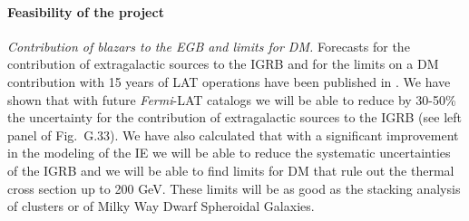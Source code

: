 \documentclass[12 pt]{article}
\begin{document}



\vspace{-0.5cm}
\paragraph{Feasibility of the project}
{\it Contribution of blazars to the EGB and limits for DM.}
Forecasts for the contribution of extragalactic sources to the IGRB and for the limits on a DM contribution with 15 years of LAT operations have been published in \cite{Charles:2016pgz}.
We have shown that with future {\it Fermi}-LAT catalogs we will be able to reduce by 30-50\% the uncertainty for the contribution of extragalactic sources to the IGRB (see left panel of Fig.~G.33).
We have also calculated that with a significant improvement in the modeling of the IE we will be able to reduce the systematic uncertainties of the IGRB and we will be able to find limits for DM that rule out the thermal cross section up to 200 GeV.
These limits will be as good as the stacking analysis of clusters or of Milky Way Dwarf Spheroidal Galaxies.




\end{document}
